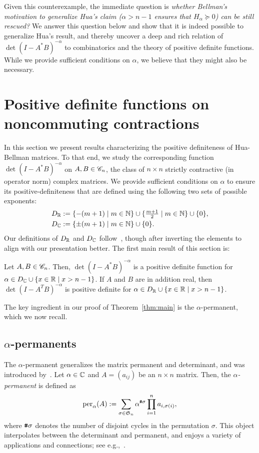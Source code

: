 \documentclass[11pt]{article}
\begin{document}
Given this counterexample, the immediate question is \emph{whether Bellman's motivation to generalize Hua's claim ($\alpha > n-1$ ensures that $H_\alpha \succeq 0$) can be still rescued?} We answer this question below and show that it is indeed possible to generalize Hua's result, and thereby uncover a deep and rich relation of $\det(I-A^*B)^{-\alpha}$ to combinatorics and the theory of positive definite functions. While we provide sufficient conditions on $\alpha$, we believe that they might also be necessary.

\section{Positive definite functions on noncommuting contractions}
In this section we present results characterizing the positive definiteness of Hua-Bellman matrices. To that end, we study the corresponding function $\det(I-A^*B)^{-\alpha}$ on $A, B \in \mathscr{C}_n$, the class of $n\times n$ strictly contractive (in operator norm) complex matrices. We provide  sufficient conditions on $\alpha$ to ensure its positive-definiteness that are defined using the following two sets of possible exponents:
\begin{align*}
  D_{\mathbb{R}} &:= \{-(m+1) \mid m \in \mathbb{N}\} \cup \{\tfrac{m+1}{2} \mid m \in \mathbb{N}\} \cup \{0\},\\
  D_{\mathbb{C}}     &:= \{\pm(m+1) \mid m \in \mathbb{N}\} \cup \{0\}.
\end{align*}
Our definitions of $D_{\mathbb{R}}$ and $D_{\mathbb{C}}$ follow~\citep{branden2012}, though after inverting the elements to align with our presentation better. The first main result of this section is:
\begin{theorem}
  \label{thm:main}
  Let $A, B \in \mathscr{C}_n$. Then, $\det(I-A^*B)^{-\alpha}$ is a positive definite function for $\alpha \in D_{\mathbb{C}} \cup \{x \in \mathbb{R} \mid x > n-1\}$. If $A$ and $B$ are in addition real, then $\det(I-A^TB)^{-\alpha}$ is positive definite for $\alpha \in D_{\mathbb{R}} \cup \{x\in \mathbb{R} \mid x > n-1\}$.
\end{theorem}
\noindent The key ingredient in our proof of Theorem~\ref{thm:main} is the $\alpha$-permanent, which we now recall. %

\subsection{$\alpha$-permanents}
The $\alpha$-permanent generalizes the matrix permanent and determinant, and was introduced by~\citet{verejones1988}. Let $\alpha\in \mathbb{C}$ and $A=(a_{ij})$ be an $n\times n$ matrix. Then, the \emph{$\alpha$-permanent} is defined as
\begin{equation}
  \label{eq:2}
  \aper(A) := \sum_{\sigma \in \mathfrak{S}_n} \alpha^{\myhash\sigma}\prod_{i=1}^n a_{i,\sigma(i)},%
\end{equation}
where $\texttt{\#}\sigma$ denotes the number of disjoint cycles in the permutation $\sigma$. This object interpolates between the determinant and permanent, and enjoys a variety of applications and connections; see e.g.,~\citep{shirai2007,crane2013,frenkel2009}.
\end{document}
